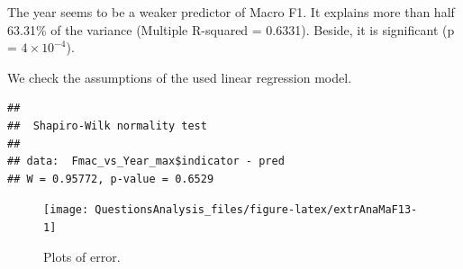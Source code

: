 \documentclass[
]{article}
\newenvironment{Shaded}{\begin{snugshade}}{\end{snugshade}}
\newcommand{\AttributeTok}[1]{\textcolor[rgb]{0.77,0.63,0.00}{#1}}
\newcommand{\ConstantTok}[1]{\textcolor[rgb]{0.00,0.00,0.00}{#1}}
\newcommand{\DecValTok}[1]{\textcolor[rgb]{0.00,0.00,0.81}{#1}}
\newcommand{\FunctionTok}[1]{\textcolor[rgb]{0.00,0.00,0.00}{#1}}
\newcommand{\NormalTok}[1]{#1}
\newcommand{\OtherTok}[1]{\textcolor[rgb]{0.56,0.35,0.01}{#1}}
\newcommand{\SpecialCharTok}[1]{\textcolor[rgb]{0.00,0.00,0.00}{#1}}
\newcommand{\StringTok}[1]{\textcolor[rgb]{0.31,0.60,0.02}{#1}}
\begin{document}
The year seems to be a weaker predictor of Macro F1. It explains more than half 63.31\% of the variance (Multiple R-squared = 0.6331). Beside, it is significant (p = \ensuremath{4\times 10^{-4}}).

We check the assumptions of the used linear regression model.

\begin{Shaded}
\end{Shaded}

\begin{verbatim}
## 
##  Shapiro-Wilk normality test
## 
## data:  Fmac_vs_Year_max$indicator - pred
## W = 0.95772, p-value = 0.6529
\end{verbatim}

\begin{Shaded}
\end{Shaded}

\begin{figure}

{\centering \texttt{[image: QuestionsAnalysis\_files/figure-latex/extrAnaMaF13-1]} 

}

\caption{Plots of error.}\label{fig:extrAnaMaF13-1}
\end{figure}

\begin{Shaded}
\end{Shaded}
\end{document}
